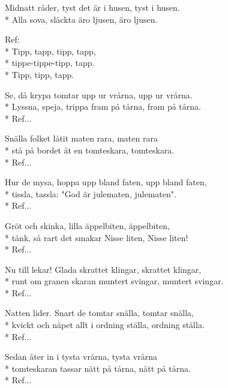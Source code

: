 \begin{SongText}
    \begin{SongVerse}
        Midnatt råder, tyst det är i husen, tyst i husen.\\*%
        Alla sova, släckta äro ljusen, äro ljusen.
    \end{SongVerse}
    \begin{SongVerse}
        Ref:\\*%
        Tipp, tapp, tipp, tapp,\\*%
        tippe-tippe-tipp, tapp.\\*%
        Tipp, tipp, tapp.
    \end{SongVerse}
    \begin{SongVerse}
        Se, då krypa tomtar upp ur vrårna, upp ur vrårna.\\*%
        Lyssna, speja, trippa fram på tårna, fram på tårna.\\*%
        Ref...
    \end{SongVerse}
    \begin{SongVerse}
        Snälla folket låtit maten rara, maten rara\\*%
        stå på bordet åt en tomteskara, tomteskara.\\*%
        Ref...
    \end{SongVerse}
    \begin{SongVerse}
        Hur de mysa, hoppa upp bland faten, upp bland faten,\\*%
        tissla, tassla: "God är julematen, julematen".\\*%
        Ref...
    \end{SongVerse}
    \begin{SongVerse}
        Gröt och skinka, lilla äppelbiten, äppelbiten,\\*%
        tänk, så rart det smakar Nisse liten, Nisse liten!\\*%
        Ref...
    \end{SongVerse}
    \begin{SongVerse}
        Nu till lekar! Glada skrattet klingar, skrattet klingar,\\*%
        runt om granen skaran muntert svingar, muntert svingar.\\*%
        Ref...
    \end{SongVerse}
    \begin{SongVerse}
        Natten lider. Snart de tomtar snälla, tomtar snälla,\\*%
        kvickt och näpet allt i ordning ställa, ordning ställa.\\*%
        Ref...
    \end{SongVerse}
    \begin{SongVerse}
        Sedan åter in i tysta vrårna, tysta vrårna\\*%
        tomteskaran tassar nätt på tårna, nätt på tårna.\\*%
        Ref...
    \end{SongVerse}
    \begin{SongVerse}
    \end{SongVerse}
\end{SongText}
